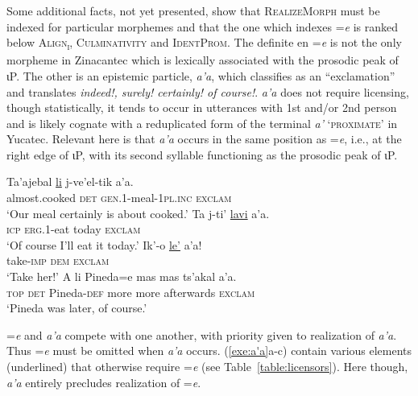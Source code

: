 \documentclass[output=paper,
modfonts
]{LSP/langsci}
\begin{document}
Some additional facts, not yet presented, show that \textsc{RealizeMorph} must be indexed for particular morphemes and that
the one which indexes =\emph{e} is ranked below \textsc{Align\textsubscript{ι}}, \textsc{Culminativity} and  \textsc{IdentProm}.
The definite en  =\emph{e} is
not the only morpheme in Zinacantec  which is lexically associated with the prosodic peak of ιP. 
The other is an epistemic particle, \emph{a'a}, which \citet{laughlin1975}
classifies as an ``exclamation'' and translates  \emph{indeed!, surely! certainly! of course!}. \emph{a'a} does not require licensing, though statistically, it tends to occur in utterances with 1st and/or 2nd person  and is likely cognate
with a reduplicated form of the terminal  \emph{a'} \textsc{`proximate'} in Yucatec.  
Relevant here is that \emph{a'a} occurs in the same position as =\emph{e}, i.e., at the right edge of
ιP, with its second syllable functioning as the prosodic peak of ιP. 
\begin{exe}
\ex
\begin{xlist}
\gll Ta'ajebal \underline{li} j-ve'el-tik a'a. \\
almost.cooked \textsc{det} \textsc{gen.1}-meal-\textsc{1pl.inc} \textsc{exclam} \\
\glt `Our meal certainly is about cooked.' \citep[285]{laughlin1977}
\gll Ta j-ti' \underline{lavi}  a'a.\\
\textsc{icp} \textsc{erg.1}-eat today \textsc{exclam}   \\
\glt  `Of course I'll eat it today.' \citep[283]{laughlin1977}
\gll Ik'-o \underline{le'} a'a! \\
take-\textsc{imp} \textsc{dem} \textsc{exclam} \\
\glt `Take her!' \citep[126]{laughlin1977}
\gll  A li Pineda=e mas mas ts'akal a'a. \\
\textsc{top} \textsc{det} Pineda-\textsc{def} more more afterwards  \textsc{exclam} \\
\glt `Pineda was later, of course.' \citep[116]{laughlin1977} 
\end{xlist}
\label{exe:a'a}
\end{exe}
=\emph{e} and \emph{a'a} compete
with one another, with priority given to realization of \emph{a'a}. Thus =\emph{e} must be omitted when \emph{a'a} occurs. 
 (\ref{exe:a'a}a-c) contain various elements
(underlined) that otherwise require =\emph{e} (see Table~\ref{table:licensors}). Here though, \emph{a'a} entirely precludes realization of =\emph{e}.
\end{document}
